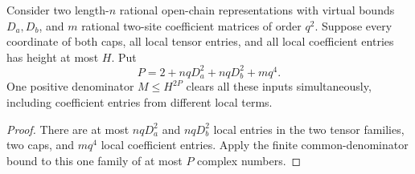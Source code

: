 \begin{lemma}
    \label{lem:lvv_local_energy_common_input_denominator}
    \leanok
    Consider two length-$n$ rational open-chain representations with
    virtual bounds $D_a,D_b$, and $m$ rational two-site coefficient
    matrices of order $q^2$. Suppose every coordinate of both caps,
    all local tensor entries, and all local coefficient entries has
    height at most $H$. Put
    \[
        P=2+nqD_a^2+nqD_b^2+mq^4.
    \]
    One positive denominator $M\le H^{2P}$ clears all these inputs
    simultaneously, including coefficient entries from different
    local terms.
\end{lemma}
\begin{proof}\leanok
    There are at most $nqD_a^2$ and $nqD_b^2$ local entries in the
    two tensor families, two caps, and $mq^4$ local coefficient
    entries. Apply the finite common-denominator bound to this one
    family of at most $P$ complex numbers.
\end{proof}

